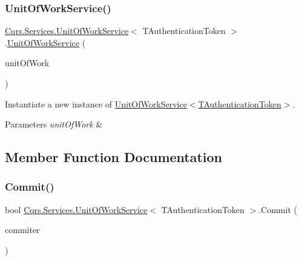 \subsubsection{\texorpdfstring{Unit\+Of\+Work\+Service()}{UnitOfWorkService()}}
{\footnotesize\ttfamily \hyperlink{classCqrs_1_1Services_1_1UnitOfWorkService}{Cqrs.\+Services.\+Unit\+Of\+Work\+Service}$<$ T\+Authentication\+Token $>$.\hyperlink{classCqrs_1_1Services_1_1UnitOfWorkService}{Unit\+Of\+Work\+Service} (\begin{DoxyParamCaption}\item[{\hyperlink{interfaceCqrs_1_1Domain_1_1IUnitOfWork}{I\+Unit\+Of\+Work}$<$ T\+Authentication\+Token $>$}]{unit\+Of\+Work }\end{DoxyParamCaption})}



Instantiate a new instance of \hyperlink{classCqrs_1_1Services_1_1UnitOfWorkService_a187b3f612490a8316770bb7c6a9aa25f_a187b3f612490a8316770bb7c6a9aa25f}{Unit\+Of\+Work\+Service$<$\+T\+Authentication\+Token$>$}. 


\begin{DoxyParams}{Parameters}
{\em unit\+Of\+Work} & \\
\hline
\end{DoxyParams}


\subsection{Member Function Documentation}
\mbox{\label{classCqrs_1_1Services_1_1UnitOfWorkService_a3291740821150ecea174820ed27ee56c_a3291740821150ecea174820ed27ee56c}} 
\subsubsection{\texorpdfstring{Commit()}{Commit()}}
{\footnotesize\ttfamily bool \hyperlink{classCqrs_1_1Services_1_1UnitOfWorkService}{Cqrs.\+Services.\+Unit\+Of\+Work\+Service}$<$ T\+Authentication\+Token $>$.Commit (\begin{DoxyParamCaption}\item[{object}]{commiter }\end{DoxyParamCaption})}



